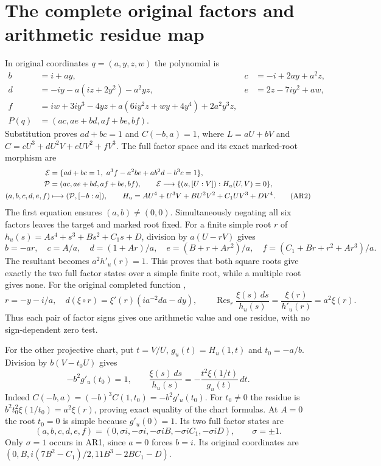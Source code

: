 \documentclass[11pt]{article}
\begin{document}
\section{The complete original factors and arithmetic residue map}
In original coordinates $q=(a,y,z,w)$ the polynomial is
\begin{align}
b&=i+ay,&c&=-i+2ay+a^2z,\nonumber\\
d&=-iy-a(iz+2y^2)-a^2yz,&e&=2z-7iy^2+aw,\nonumber\\
f&=iw+3iy^3-4yz+a(6iy^2z+wy+4y^4)+2a^2y^3z,\nonumber\\
P(q)&=(ac,ae+bd,af+be,bf). \tag{AR1}
\end{align}
Substitution proves $ad+bc=1$ and $C(-b,a)=1$, where
$L=aU+bV$ and $C=cU^3+dU^2V+eUV^2+fV^3$.
The full factor space and its exact marked-root morphism are
\begin{align}
{\cal E}&=\{ad+bc=1,\ a^3f-a^2be+ab^2d-b^3c=1\},\nonumber\\
{\cal P}&=(ac,ae+bd,af+be,bf),\qquad
{\cal E}\longrightarrow\{(u,[U:V]):H_u(U,V)=0\},\nonumber\\
(a,b,c,d,e,f)&\longmapsto({\cal P},[-b:a]),\qquad
H_u=AU^4+U^3V+BU^2V^2+C_1UV^3+DV^4.
\tag{AR2}
\end{align}
The first equation ensures $(a,b)\ne(0,0)$. Simultaneously
negating all six factors leaves the target and marked root fixed.
For a finite simple root $r$ of
$h_u(s)=As^4+s^3+Bs^2+C_1s+D$, division by $a(U-rV)$ gives
\[
b=-ar,\quad c=A/a,\quad d=(1+Ar)/a,\quad
e=(B+r+Ar^2)/a,\quad f=(C_1+Br+r^2+Ar^3)/a.
\]
The resultant becomes $a^2h'_u(r)=1$. This proves that both
square roots give exactly the two full factor states over a
simple finite root, while a multiple root gives none.
For the original completed function \cite{DLMFXi},
\begin{equation}
r=-y-i/a,\quad
d(\xi\circ r)=\xi'(r)(ia^{-2}da-dy),\qquad
\operatorname{Res}_r\frac{\xi(s)\,ds}{h_u(s)}
=\frac{\xi(r)}{h'_u(r)}=a^2\xi(r).
\tag{AR3}
\end{equation}
Thus each pair of factor signs gives one arithmetic value
and one residue, with no sign-dependent zero test.

For the other projective chart, put $t=V/U$, $g_u(t)=H_u(1,t)$
and $t_0=-a/b$. Division by $b(V-t_0U)$ gives
\begin{equation}
-b^2g'_u(t_0)=1,\qquad
\frac{\xi(s)\,ds}{h_u(s)}
=-\frac{t^2\xi(1/t)}{g_u(t)}\,dt.
\tag{AR4}
\end{equation}
Indeed $C(-b,a)=(-b)^3C(1,t_0)=-b^2g'_u(t_0)$.
For $t_0\ne0$ the residue is
$b^2t_0^2\xi(1/t_0)=a^2\xi(r)$, proving exact equality
of the chart formulas. At $A=0$ the root $t_0=0$ is simple
because $g'_u(0)=1$. Its two full factor states are
\begin{equation}
(a,b,c,d,e,f)=
(0,\sigma i,-\sigma i,-\sigma iB,-\sigma iC_1,-\sigma iD),
\qquad \sigma=\pm1.
\tag{AR5}
\end{equation}
Only $\sigma=1$ occurs in AR1, since $a=0$ forces $b=i$.
Its original coordinates are
$(0,B,i(7B^2-C_1)/2,11B^3-2BC_1-D)$.
\end{document}

